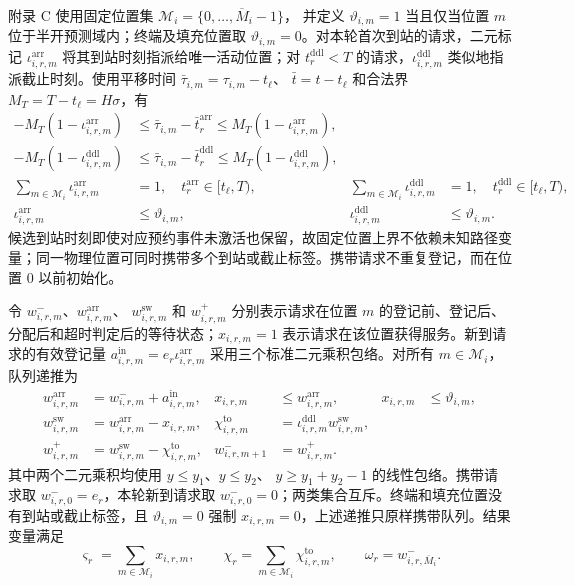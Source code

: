 \documentclass[12pt,a4paper,UTF8]{ctexart}
\begin{document}
附录 C 使用固定位置集
$\mathcal M_i=\{0,\ldots,\overline M_i-1\}$，
并定义 $\vartheta_{i,m}=1$ 当且仅当位置 $m$ 位于半开预测域内；终端及填充位置取 $\vartheta_{i,m}=0$。对本轮首次到站的请求，二元标记 $\iota_{i,r,m}^{\mathrm{arr}}$ 将其到站时刻指派给唯一活动位置；对 $t_r^{\mathrm{ddl}}<T$ 的请求，$\iota_{i,r,m}^{\mathrm{ddl}}$ 类似地指派截止时刻。使用平移时间
$\bar\tau_{i,m}=\tau_{i,m}-t_\ell$、
$\bar t=t-t_\ell$ 和合法界
$M_T=T-t_\ell=H\sigma$，有
\begin{subequations}
\label{eq:event_time_assignment}
\begin{align}
-M_T(1-\iota_{i,r,m}^{\mathrm{arr}})
&\le \bar\tau_{i,m}-\bar t_r^{\mathrm{arr}}
\le M_T(1-\iota_{i,r,m}^{\mathrm{arr}}),\\
-M_T(1-\iota_{i,r,m}^{\mathrm{ddl}})
&\le \bar\tau_{i,m}-\bar t_r^{\mathrm{ddl}}
\le M_T(1-\iota_{i,r,m}^{\mathrm{ddl}}),\\
\sum_{m\in\mathcal M_i}\iota_{i,r,m}^{\mathrm{arr}}&=1,
\quad t_r^{\mathrm{arr}}\in[t_\ell,T),&
\sum_{m\in\mathcal M_i}\iota_{i,r,m}^{\mathrm{ddl}}&=1,
\quad t_r^{\mathrm{ddl}}\in[t_\ell,T),\\
\iota_{i,r,m}^{\mathrm{arr}}&\le \vartheta_{i,m},&
\iota_{i,r,m}^{\mathrm{ddl}}&\le \vartheta_{i,m}.
\end{align}
\end{subequations}
候选到站时刻即使对应预约事件未激活也保留，故固定位置上界不依赖未知路径变量；同一物理位置可同时携带多个到站或截止标签。携带请求不重复登记，而在位置 $0$ 以前初始化。

令 $w_{i,r,m}^-$、$w_{i,r,m}^{\mathrm{arr}}$、
$w_{i,r,m}^{\mathrm{sw}}$ 和 $w_{i,r,m}^+$ 分别表示请求在位置 $m$ 的登记前、登记后、分配后和超时判定后的等待状态；$x_{i,r,m}=1$ 表示请求在该位置获得服务。新到请求的有效登记量
$a_{i,r,m}^{\mathrm{in}}=e_r\iota_{i,r,m}^{\mathrm{arr}}$
采用三个标准二元乘积包络。对所有 $m\in\mathcal M_i$，队列递推为
\begin{subequations}
\label{eq:queue_event_flow}
\begin{align}
w_{i,r,m}^{\mathrm{arr}}
&=w_{i,r,m}^-+a_{i,r,m}^{\mathrm{in}},&
x_{i,r,m}&\le w_{i,r,m}^{\mathrm{arr}},&
x_{i,r,m}&\le \vartheta_{i,m},\\
w_{i,r,m}^{\mathrm{sw}}
&=w_{i,r,m}^{\mathrm{arr}}-x_{i,r,m},&
\chi_{i,r,m}^{\mathrm{to}}
&=\iota_{i,r,m}^{\mathrm{ddl}}w_{i,r,m}^{\mathrm{sw}},\\
w_{i,r,m}^{+}
&=w_{i,r,m}^{\mathrm{sw}}-\chi_{i,r,m}^{\mathrm{to}},&
w_{i,r,m+1}^{-}&=w_{i,r,m}^{+}.
\end{align}
\end{subequations}
其中两个二元乘积均使用
$y\le y_1$、$y\le y_2$、
$y\ge y_1+y_2-1$ 的线性包络。携带请求取
$w_{i,r,0}^-=e_r$，本轮新到请求取
$w_{i,r,0}^-=0$；两类集合互斥。终端和填充位置没有到站或截止标签，且 $\vartheta_{i,m}=0$ 强制 $x_{i,r,m}=0$，上述递推只原样携带队列。结果变量满足
\begin{equation}
\varsigma_r=\sum_{m\in\mathcal M_i}x_{i,r,m},
\qquad
\chi_r=\sum_{m\in\mathcal M_i}\chi_{i,r,m}^{\mathrm{to}},
\qquad
\omega_r=w_{i,r,\overline M_i}^{-}.
\label{eq:queue_outcome_link}
\end{equation}
\end{document}
